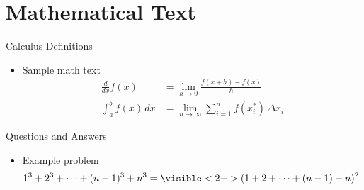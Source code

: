 \documentclass{beamer}
\begin{document}
\section[Math]{Mathematical Text}

\begin{frame}{Calculus Definitions}

\begin{itemize}
	\item Sample math text
	\begin{align*}
		\frac{d}{dx} f(x) &= \lim_{h \to 0} \frac{f(x+h) - f(x)}{h} \\
		\int_a^b f(x) \, dx &= \lim_{n \to \infty} \sum_{i=1}^n f(x_i^*) \, \Delta x_i
	\end{align*}
\end{itemize}

\end{frame}

\begin{frame}{Questions and Answers}

\begin{itemize}
	\item Example problem
	\begin{align*}
		1^3 + 2^3 + \dots + (n-1)^3 + n^3 &= \visible<2->{(1 + 2 + \dots + (n-1) + n)^2}
	\end{align*}
\end{itemize}

\end{frame}
\end{document}
